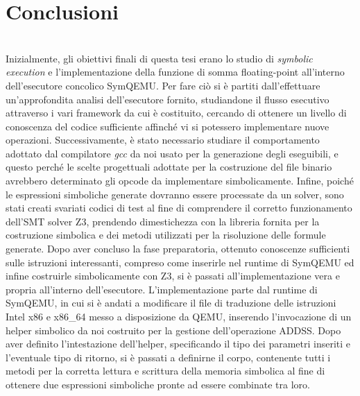 \documentclass[Lau, oneside]{sapthesis}%
\begin{document}
\chapter{Conclusioni}
\ \\
Inizialmente, gli obiettivi finali di questa tesi erano lo studio di \textit{symbolic execution} e l'implementazione della funzione di somma floating-point all'interno dell'esecutore concolico SymQEMU.
\newline \newline
Per fare ciò si è partiti dall'effettuare un'approfondita analisi dell'esecutore fornito, studiandone il flusso esecutivo attraverso i vari framework da cui è costituito, cercando di ottenere un livello di conoscenza del codice sufficiente affinché vi si potessero implementare nuove operazioni.
\newline
Successivamente, è stato necessario studiare il comportamento adottato dal compilatore \textit{gcc} da noi usato per la generazione degli eseguibili, e questo perché le scelte progettuali adottate per la costruzione del file binario avrebbero determinato gli opcode da implementare simbolicamente.
\newline
Infine, poiché le espressioni simboliche generate dovranno essere processate da un solver, sono stati creati svariati codici di test al fine di comprendere il corretto funzionamento dell'SMT solver Z3, prendendo dimestichezza con la libreria fornita per la costruzione simbolica e dei metodi utilizzati per la risoluzione delle formule generate.
\newline \newline
Dopo aver concluso la fase preparatoria, ottenuto conoscenze sufficienti sulle istruzioni interessanti, compreso come inserirle nel runtime di SymQEMU ed infine costruirle simbolicamente con Z3, si è passati all'implementazione vera e propria all'interno dell'esecutore.
\newline \newline
L'implementazione parte dal runtime di SymQEMU, in cui si è andati a modificare il file di traduzione delle istruzioni Intel x86 e x86\_64 messo a disposizione da QEMU, inserendo l'invocazione di un helper simbolico da noi costruito per la gestione dell'operazione ADDSS.
\newline
Dopo aver definito l'intestazione dell'helper, specificando il tipo dei parametri inseriti e l'eventuale tipo di ritorno, si è passati a definirne il corpo, contenente tutti i metodi per la corretta lettura e scrittura della memoria simbolica al fine di ottenere due espressioni simboliche pronte ad essere combinate tra loro.
\end{document}
